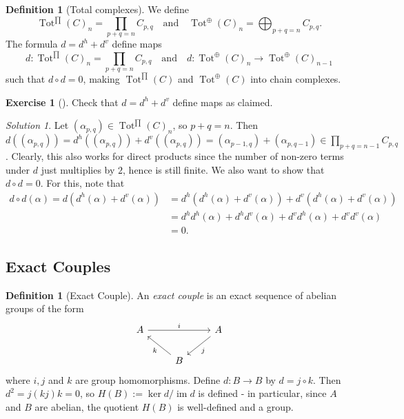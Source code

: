 \documentclass[reqno]{amsart}
\theoremstyle{definition}
\newtheorem{definition}[theorem]{Definition}
\newtheorem{exercise}[theorem]{Exercise}
\theoremstyle{remark}
\newtheorem*{solution}{Solution}
\DeclareMathOperator{\im}{im}
\DeclareMathOperator{\Tot}{Tot}
\begin{document}
 \begin{definition}[Total complexes]
    We define
    \[
        \Tot^{\prod}(C)_n = 
        \prod_{p+q=n}C_{p,q} \quad
        \text{and} \quad
        \Tot^{\oplus} (C)_n = 
        \bigoplus_{p+q=n}C_{p,q}.
    \] 
    The formula $d = d^{h} + d^{v}$ define maps
    \[
        d \colon \Tot^{\prod} (C)_n = 
        \prod_{p+q = n} C_{p,q} \quad \text{and} \quad
        d \colon \Tot^{\oplus}(C)_n \to 
        \Tot^{\oplus} (C)_{n-1}
    \] 
    such that $d \circ d = 0$, making
    $\Tot^{\prod}(C)$ and
    $\Tot^{\oplus}(C)$ into chain complexes.
\end{definition}

\begin{exercise}[]
    Check that $d = d^{h} + d^{v}$ define maps as
    claimed.
\end{exercise}

\begin{solution}
    Let
    $\left( \alpha_{p,q} \right) 
    \in \Tot^{\prod}(C)_n$, so
    $p+q = n$. Then
    $d \left( \left( \alpha_{p,q} \right)  \right) 
    = d^{h} \left( \left( \alpha_{p,q} \right)  \right) 
    + d^{v} \left( \left( \alpha_{p,q} \right)  \right) 
    = \left( \alpha_{p-1,q} \right) 
    + \left( \alpha_{p,q-1} \right) \in 
    \prod_{p+q=n-1} C_{p,q}$.
    Clearly, this also works for
    direct products since the number of non-zero terms 
    under $d$ just multiplies by $2$, hence is still finite.
    We also want to show that
    $d \circ d = 0$. For this, note that
    \begin{align*}
        d \circ d \left( \alpha \right) =
    d \left( d^{h} (\alpha) + d^{v}(\alpha) \right) 
    &= d^{h} \left( d^{h}(\alpha) + 
    d^{v} (\alpha) \right) +
    d^{v} \left( d^{h}(\alpha) + d^{v}(\alpha) \right)\\
    &= d^{h}d^{h} (\alpha) + d^{h} d^{v}(\alpha)
+ d^{v} d^{h}(\alpha) + d^{v} d^{v} (\alpha) \\
    &= 0.
    \end{align*}
\end{solution}

\subsection{Exact Couples}

\begin{definition}[Exact Couple]
    An \textit{exact couple} is an exact sequence of
    abelian groups of the form
    \begin{equation*}
    \begin{tikzcd}
        A \ar[rr, "i"] & & A \ar[dl, "j"] \\
                       & B \ar[ul, "k"] &
    \end{tikzcd}
    \end{equation*}
    where $i,j$ and $k$ are group homomorphisms. Define
    $d \colon B \to B$ by $d = j \circ k$.
    Then $d^2 = j (kj)k = 0$, so
    $H(B) := \ker d / \im d$ is defined - in particular,
    since $A$ and $B$ are abelian, the quotient
    $H(B)$ is well-defined and a group.
\end{definition}
\end{document}
